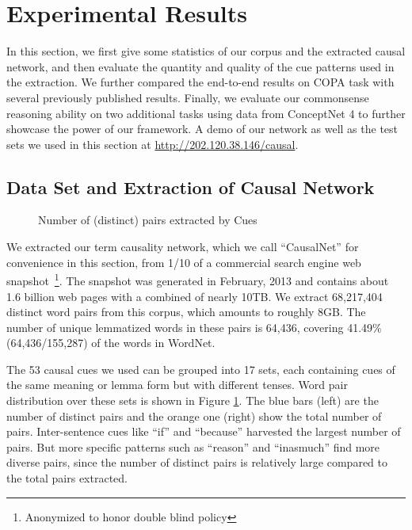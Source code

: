 \section{Experimental Results}
\label{sec:eval}
In this section, we first give some statistics of our corpus and the
extracted causal network, and then evaluate the quantity
and quality of the cue patterns used in the extraction.
We further compared the end-to-end results on COPA task with
several previously published results.
Finally, we evaluate our commonsense reasoning ability on
two additional tasks using data from ConceptNet 4 to further
showcase the power of our framework. A demo of our network
as well as the test sets we used in this section at
\url{http://202.120.38.146/causal}.

\subsection{Data Set and Extraction of Causal Network}
\begin{figure}[th]
\centering
{}
\caption{Number of (distinct) pairs extracted by Cues}
\label{fig:pattern1}
\end{figure}
We extracted our term causality network, which we call ``CausalNet''
for convenience in this section, from 1/10
of a commercial search engine web snapshot~\footnote{Anonymized to
honor double blind policy}.
The snapshot was generated in February, 2013 and contains about 1.6
billion web pages with a combined of nearly 10TB.
We extract 68,217,404 distinct word pairs from this corpus, 
which amounts to roughly 8GB. The number of unique lemmatized words in 
these pairs is 64,436, covering 41.49\% (64,436/155,287) of the 
words in WordNet. 

The 53 causal cues we used can be grouped into 17 sets, each
containing cues of the same meaning or lemma form but with different
tenses. Word pair distribution over these sets is shown in Figure
\ref{fig:pattern1}. The blue bars (left) are the number of distinct
pairs and the orange one (right) show the total number of pairs.
Inter-sentence cues like ``if'' and ``because'' harvested the
largest number of pairs. But more specific patterns such as
``reason'' and ``inasmuch'' find more diverse pairs, since the
number of distinct pairs is relatively large compared to the total
pairs extracted.

